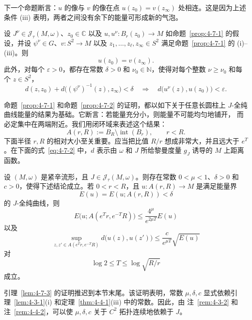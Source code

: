 下一个命题断言：$u$ 的像与 $v$ 的像在点 $u(z_0)=v(z_\infty)$ 处相连。这是因为上述
条件 (iii) 表明，两者之间没有余下的能量可形成新的气泡。

\begin{proposition}\label{prop:4-7-2}
设 $J^\nu\in\mathcal J_\tau(M,\omega)$、$z_0\in\mathbb C$ 以及
$u,u^\nu:B_r(z_0)\to M$ 如命题~\ref{prop:4-7-1} 的假设，并设
$\psi^\nu\in G$、$v:S^2\to M$ 以及
$z_1,\ldots,z_\ell,z_\infty\in S^2$ 满足命题~\ref{prop:4-7-1} 的 (i)--(iii)。则
\[
  u(z_0)=v(z_\infty).
\]
此外，对每个 $\varepsilon>0$，都存在常数 $\delta>0$ 和
$\nu_0\in\mathbb N$，使得对每个整数 $\nu\ge\nu_0$ 和每个 $z\in S^2$，
\[
  d(z,z_0)+d\bigl((\psi^\nu)^{-1}(z),z_\infty\bigr)<\delta
  \quad\Longrightarrow\quad
  d\bigl(u^\nu(z),u(z_0)\bigr)<\varepsilon.
\]
\end{proposition}

命题~\ref{prop:4-7-1} 和命题~\ref{prop:4-7-2} 的证明，都以如下关于任意长圆柱上
$J$-全纯曲线能量的结果为基础。它断言：若能量充分小，则能量不可能均匀地铺开，
而必定集中在两端附近。我们用闭环域来表述这个结果：
\[
  A(r,R):=B_R\setminus\operatorname{int}(B_r),
  \qquad r<R.
\]
下面半径 $r,R$ 的相对大小至关重要。应当把比值 $R/r$ 想成非常大，并且远大于
$e^T$。在下面的式~\eqref{eq:4-7-2} 中，$d$ 表示由 $\omega$ 和 $J$ 所给黎曼度量
$g_J$ 诱导的 $M$ 上距离函数。

\begin{lemma}\label{lem:4-7-3}
设 $(M,\omega)$ 是紧辛流形，且 $J\in\mathcal J_\tau(M,\omega)$。则存在常数
$0<\mu<1$、$\delta>0$ 和 $c>0$，使得下述结论成立。若 $0<r<R$，且
$u:A(r,R)\to M$ 是满足能量界
\[
  E(u)=E(u;A(r,R))<\delta
\]
的 $J$-全纯曲线，则
\begin{equation}\label{eq:4-7-1}
  E\bigl(u;A(e^Tr,e^{-T}R)\bigr)
  \le\frac{4^\mu}{e^{2\mu T}}E(u)
\end{equation}
以及
\begin{equation}\label{eq:4-7-2}
  \sup_{z,z'\in A(e^Tr,e^{-T}R)}d\bigl(u(z),u(z')\bigr)
  \le\frac c{e^{\mu T}}\sqrt{E(u)}
\end{equation}
对
\[
  \log2\le T\le\log\sqrt{R/r}
\]
成立。
\end{lemma}

\begin{remark}\label{rem:4-7-4}
引理~\ref{lem:4-7-3} 的证明推迟到本节末尾。该证明表明，常数 $\mu,\delta,c$
显式依赖引理~\ref{lem:4-3-1}(i) 和定理~\ref{thm:4-4-1}(iii) 中的常数。因此，由
注~\ref{rem:4-3-2} 和注~\ref{rem:4-4-2}，可以使 $\mu,\delta,c$ 关于
$C^2$ 拓扑连续地依赖于 $J$。
\end{remark}

